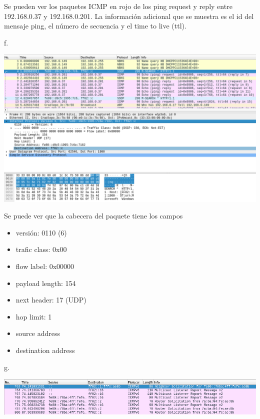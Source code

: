 \documentclass[11pt]{article}
\begin{document}
\begin{enumerate}
Se pueden ver los paquetes ICMP en rojo de los ping request y reply entre 192.168.0.37 y 192.168.0.201. La información adicional que se muestra es el id del mensaje ping, el número de secuencia y el time to live (ttl).

f.
\begin{center}
\includegraphics[width=.9\linewidth]{./1f.png}
\end{center}
Se puede ver que la cabecera del paquete tiene los campos
\begin{itemize}
\item versión: 0110 (6)
\item trafic class: 0x00
\item flow label: 0x00000
\item payload length: 154
\item next header: 17 (UDP)
\item hop limit: 1
\item source address
\item destination address
\end{itemize}

g.
\begin{center}
\includegraphics[width=.9\linewidth]{./1g.png}
\end{center}


\end{enumerate}
\end{document}
